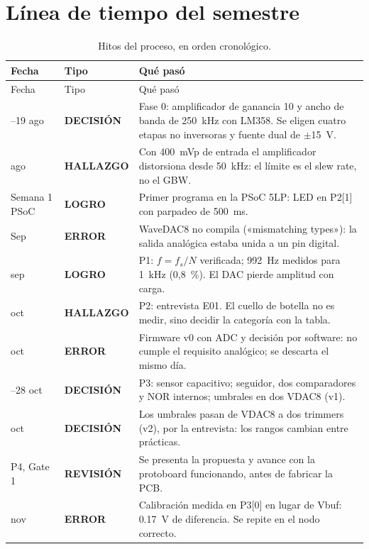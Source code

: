 \documentclass[11pt,a4paper]{article}
\newcommand{\etq}[2]{\colorbox{#1!15}{\textcolor{#1}{\scriptsize\bfseries #2}}}
\newcommand{\terr}{\etq{nok}{ERROR}}
\newcommand{\tdec}{\etq{usco}{DECISIÓN}}
\newcommand{\tlog}{\etq{ok}{LOGRO}}
\newcommand{\thal}{\etq{pend}{HALLAZGO}}
\newcommand{\trev}{\etq{gris}{REVISIÓN}}
\begin{document}
\tableofcontents
\newpage

\section{Línea de tiempo del semestre}\label{sec:linea}
\begin{longtable}{>{\raggedright\arraybackslash}p{2.0cm}>{\raggedright\arraybackslash}p{1.9cm}>{\raggedright\arraybackslash}p{10.7cm}}
\caption{Hitos del proceso, en orden cronológico.}\label{tab:linea}\\
\toprule
Fecha & Tipo & Qué pasó \\
\midrule\endfirsthead
\toprule Fecha & Tipo & Qué pasó \\ \midrule\endhead
17--19 ago & \tdec & Fase 0: amplificador de ganancia 10 y ancho de banda de \SI{250}{kHz} con LM358. Se eligen cuatro etapas no inversoras y fuente dual de $\pm$\SI{15}{V}. \\
19 ago & \thal & Con \SI{400}{mVp} de entrada el amplificador distorsiona desde \SI{50}{kHz}: el límite es el slew rate, no el GBW. \\
Semana 1 PSoC & \tlog & Primer programa en la PSoC 5LP: LED en P2[1] con parpadeo de \SI{500}{ms}. \\
Sep & \terr & WaveDAC8 no compila («mismatching types»): la salida analógica estaba unida a un pin digital. \\
26 sep & \tlog & P1: $f=f_s/N$ verificada; \SI{992}{Hz} medidos para \SI{1}{kHz} (0,8~\%). El DAC pierde amplitud con carga. \\
19 oct & \thal & P2: entrevista E01. El cuello de botella no es medir, sino decidir la categoría con la tabla. \\
27 oct & \terr & Firmware v0 con ADC y decisión por software: no cumple el requisito analógico; se descarta el mismo día. \\
27--28 oct & \tdec & P3: sensor capacitivo; seguidor, dos comparadores y NOR internos; umbrales en dos VDAC8 (v1). \\
29 oct & \tdec & Los umbrales pasan de VDAC8 a dos trimmers (v2), por la entrevista: los rangos cambian entre prácticas. \\
P4, Gate 1 & \trev & Se presenta la propuesta y avance con la protoboard funcionando, antes de fabricar la PCB. \\
3 nov & \terr & Calibración medida en P3[0] en lugar de Vbuf: \SI{0.17}{V} de diferencia. Se repite en el nodo correcto. \\

\end{longtable}
\end{document}
